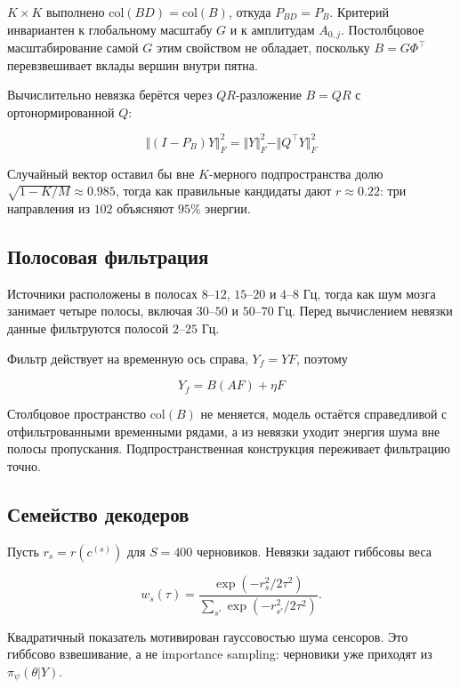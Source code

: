 
$K \times K$ выполнено $\mathrm{col}(BD)=\mathrm{col}(B)$, откуда $P_{BD}=P_B$. Критерий инвариантен к глобальному масштабу $G$ и к амплитудам $A_{0,j}$. Постолбцовое масштабирование самой $G$ этим свойством не обладает, поскольку $B=G\Phi^{\top}$ перевзвешивает вклады вершин внутри пятна.

Вычислительно невязка берётся через $QR$-разложение $B=QR$ с ортонормированной $Q$:

$$\Vert (I-P_B)Y \Vert_F^2 = \Vert Y \Vert_F^2 - \Vert Q^{\top}Y \Vert_F^2$$

Случайный вектор оставил бы вне $K$-мерного подпространства долю $\sqrt{1-K/M}\approx 0.985$, тогда как правильные кандидаты дают $r \approx 0.22$: три направления из $102$ объясняют $95\%$ энергии.

\subsection{Полосовая фильтрация}

Источники расположены в полосах $8$--$12$, $15$--$20$ и $4$--$8$ Гц, тогда как шум мозга занимает четыре полосы, включая $30$--$50$ и $50$--$70$ Гц. Перед вычислением невязки данные фильтруются полосой $2$--$25$ Гц.

Фильтр действует на временную ось справа, $Y_f = YF$, поэтому

$$Y_f = B(AF) + \eta F$$

Столбцовое пространство $\mathrm{col}(B)$ не меняется, модель остаётся справедливой с отфильтрованными временными рядами, а из невязки уходит энергия шума вне полосы пропускания. Подпространственная конструкция переживает фильтрацию точно.

\subsection{Семейство декодеров}

Пусть $r_s = r(c^{(s)})$ для $S=400$ черновиков. Невязки задают гиббсовы веса

$$w_s(\tau)=\frac{\exp(-r_s^2/2\tau^2)}{\sum_{s'}\exp(-r_{s'}^2/2\tau^2)}.$$

Квадратичный показатель мотивирован гауссовостью шума сенсоров. Это гиббсово взвешивание, а не importance sampling: черновики уже приходят из $\pi_\psi(\theta \vert Y)$.

